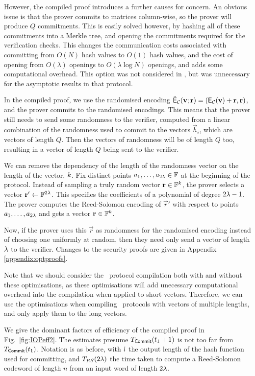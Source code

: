 However, the compiled proof introduces a further causes for concern. An obvious issue is that the prover commits to matrices column-wise, so the prover will  produce $Q$ commitments. This is easily solved however, by hashing all of these commitments into a Merkle tree, and opening the commitments required for the verification checks. This changes the communication costs associated with committing from $O(N)$ hash values to $O(1)$ hash values, and the cost of opening from $O(\lambda)$ openings to $O(\lambda \log N)$ openings, and adds some computational overhead. This option was not considered in \cite{BootleCGGHJ17}, but was unnecessary for the asymptotic results in that protocol.

In the compiled proof, we use the randomised encoding $\tilde{\mathsf{E}}_{\mathcal{C}}({\mathbf{v}};\mathbf{r})=(\mathsf{E}_{\mathcal{C}}({\mathbf{v}})+\mathbf{r},\mathbf{r})$, and the prover commits to the randomised encodings. This means that the prover still needs to send some randomness to the verifier, computed from a linear combination of the randomness used to commit to the vectors $\vec{h}_i$, which are vectors of length $Q$. Then the vectors of randomness will be of length $Q$ too, resulting in a vector of length $Q$ being sent to the verifier.

We can remove the dependency of the length of the randomness vector on the length of the vector, $k$. Fix distinct points $a_1,\ldots,a_{2\lambda} \in \mathbb{F}$ at the beginning of the protocol. Instead of sampling a truly random vector $\mathbf{r} \in \mathbb{F}^k$, the prover selects a vector $\mathbf{r}' \gets \mathbb{F}^{2\lambda}$. This specifies the coefficients of a polynomial of degree $2\lambda-1$. The prover computes the Reed-Solomon encoding of $\vec{r}'$ with respect to points $a_1,\ldots,a_{2\lambda}$ and gets a vector $\mathbf{r} \in \mathbb{F}^k$.

Now, if the prover uses this $\vec{r}$ as randomness for the randomised encoding instead of choosing one uniformly at random, then they need only send a vector of length $\lambda$ to the verifier. Changes to the security proofs are given in Appendix \ref{appendix:optproofs}.

Note that we should consider the \ILC\ protocol compilation both with and without these optimisations, as these optimisations will add unecessary computational overhead into the compilation when applied to short vectors. Therefore, we can use the optimisations when compiling \ILC\ protocols with vectors of multiple lengths, and only apply them to the long vectors.

We give the dominant factors of efficiency of the compiled proof in Fig.~\ref{fig:IOPeff2}. The estimates presume $T_{\mathsf{Commit}}(t_1+1)$ is not too far from $T_{\mathsf{Commit}}(t_1)$. Notation is as before, with $l$ the output length of the hash function used for committing, and $T_{RS}(2\lambda)$ the time taken to compute a Reed-Solomon codeword of length $n$ from an input word of length $2\lambda$.

